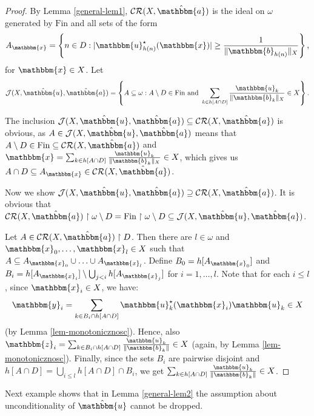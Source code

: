 \documentclass{amsart}
\newcommand{\J}{\mathcal{J}}
\newcommand{\Fin}{\mathrm{Fin}}
\newcommand{\CR}{\mathcal{CR}}
\newcommand{\w}{\mathbbm}
\begin{document}
\begin{proof}
By Lemma \ref{general-lem1}, $\CR(X,\hat{\w{a}})$ is the ideal on $\omega$ generated by $\Fin$ and all sets of the form
    \[
    A_{\w{x}}=\left\{n\in D: |\w{u}^\star_{h(n)}(\w{x})|\geq\frac{1}{\|\w{b}_{h(n)}\|_X}\right\},
    \]
for $\w{x}\in X$. Let 
\[
\J(X,\hat{\w{u}},\hat{\w{a}})=\left\{A\subseteq\omega: A\setminus D\in\Fin\text{ and }\sum_{k\in h[A\cap D]}\frac{\w{u}_{k}}{\|\w{b}_{k}\|_X}\in X\right\}.
\]

The inclusion $\J(X,\hat{\w{u}},\hat{\w{a}})\subseteq\CR(X,\hat{\w{a}})$ is obvious, as $A\in \J(X,\hat{\w{u}},\hat{\w{a}})$ means that $A\setminus D\in\Fin\subseteq\CR(X,\hat{\w{a}})$ and $\w{x}=\sum_{k\in h[A\cap D]}\frac{\w{u}_{k}}{\|\w{b}_{k}\|_X}\in X$, which gives us $A\cap D\subseteq A_{\w{x}}\in \CR(X,\hat{\w{a}})$.

Now we show $\J(X,\hat{\w{u}},\hat{\w{a}})\supseteq\CR(X,\hat{\w{a}})$. It is obvious that $\CR(X,\hat{\w{a}})\restriction\omega\setminus D=\Fin\restriction\omega\setminus D\subseteq \J(X,\hat{\w{u}},\hat{\w{a}})$. 

Let $A\in \CR(X,\hat{\w{a}})\restriction D$. Then there are $l\in\omega$ and $\w{x}_0,\ldots,\w{x}_l\in X$ such that $A\subseteq A_{\w{x}_0}\cup\ldots\cup A_{\w{x}_l}$. Define $B_0=h[A_{\w{x}_0}]$ and $B_i=h[A_{\w{x}_i}]\setminus\bigcup_{j<i}h[A_{\w{x}_j}]$ for $i=1,\ldots,l$. Note that for each $i\leq l$, since $\w{x}_i\in X$, we have:
\[
\w{y}_i=\sum_{k\in B_i\cap h[A\cap D]}\w{u}_{k}^\star(\w{x}_i)\w{u}_{k}\in X
\]
(by Lemma \ref{lem-monotonicznosc}). Hence, also $\w{z}_i=\sum_{k\in B_i\cap h[A\cap D]}\frac{\w{u}_{k}}{\|\w{b}_{k}\|}\in X$ (again, by Lemma \ref{lem-monotonicznosc}). Finally, since the sets $B_i$ are pairwise disjoint and $h[A\cap D]=\bigcup_{i\leq l}h[A\cap D]\cap B_i$, we get $\sum_{k\in h[A\cap D]}\frac{\w{u}_{k}}{\|\w{b}_{k}\|}\in X$.
\end{proof}

Next example shows that in Lemma \ref{general-lem2} the assumption about unconditionality of $\hat{\w{u}}$ cannot be dropped. 
\end{document}
